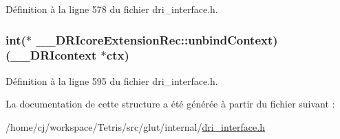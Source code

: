 Définition à la ligne 578 du fichier dri\-\_\-interface.\-h.

\hypertarget{struct_____d_r_icore_extension_rec_ae4a43dd34f32ac00dad2e7d789042488}{
\subsubsection[{unbind\-Context}]{\setlength{\rightskip}{0pt plus 5cm}int($\ast$ \-\_\-\-\_\-\-D\-R\-Icore\-Extension\-Rec\-::unbind\-Context)({\bf \-\_\-\-\_\-\-D\-R\-Icontext} $\ast$ctx)}}\label{struct_____d_r_icore_extension_rec_ae4a43dd34f32ac00dad2e7d789042488}


Définition à la ligne 595 du fichier dri\-\_\-interface.\-h.



La documentation de cette structure a été générée à partir du fichier suivant \-:\begin{DoxyCompactItemize}
\item 
/home/cj/workspace/\-Tetris/src/glut/internal/\hyperlink{dri__interface_8h}{dri\-\_\-interface.\-h}\end{DoxyCompactItemize}

